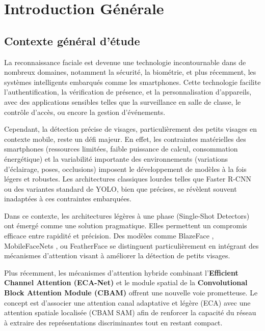 \chapter{Introduction Générale}
\begin{onehalfspace}

\section{Contexte général d'étude}

\hspace{0.65 cm}La reconnaissance faciale est devenue une technologie incontournable dans de nombreux domaines, notamment la sécurité, la biométrie, et plus récemment, les systèmes intelligents embarqués comme les smartphones. Cette technologie facilite l'authentification, la vérification de présence, et la personnalisation d'appareils, avec des applications sensibles telles que la surveillance en salle de classe, le contrôle d'accès, ou encore la gestion d'événements.

\hspace{0.65 cm}Cependant, la détection précise de visages, particulièrement des petits visages en contexte mobile, reste un défi majeur. En effet, les contraintes matérielles des smartphones (ressources limitées, faible puissance de calcul, consommation énergétique) et la variabilité importante des environnements (variations d'éclairage, poses, occlusions) imposent le développement de modèles à la fois légers et robustes. Les architectures classiques lourdes telles que Faster R-CNN ou des variantes standard de YOLO, bien que précises, se révèlent souvent inadaptées à ces contraintes embarquées.

\hspace{0.65 cm}Dans ce contexte, les architectures légères à une phase (Single-Shot Detectors) ont émergé comme une solution pragmatique. Elles permettent un compromis efficace entre rapidité et précision. Des modèles comme BlazeFace \cite{Zhang2019BlazeFace}, MobileFaceNets \cite{Chen2018MobileFaceNets}, ou FeatherFace \cite{Kim2025FeatherFace} se distinguent particulièrement en intégrant des mécanismes d'attention visant à améliorer la détection de petits visages.

\hspace{0.65 cm}Plus récemment, les mécanismes d'attention hybride combinant l'\textbf{Efficient Channel Attention (ECA-Net)} \cite{Wang2020ECANet} et le module spatial de la \textbf{Convolutional Block Attention Module (CBAM)} \cite{Woo2018CBAM} offrent une nouvelle voie prometteuse. Le concept est d'associer une attention canal adaptative et légère (ECA) avec une attention spatiale localisée (CBAM SAM) afin de renforcer la capacité du réseau à extraire des représentations discriminantes tout en restant compact.


\end{onehalfspace}
